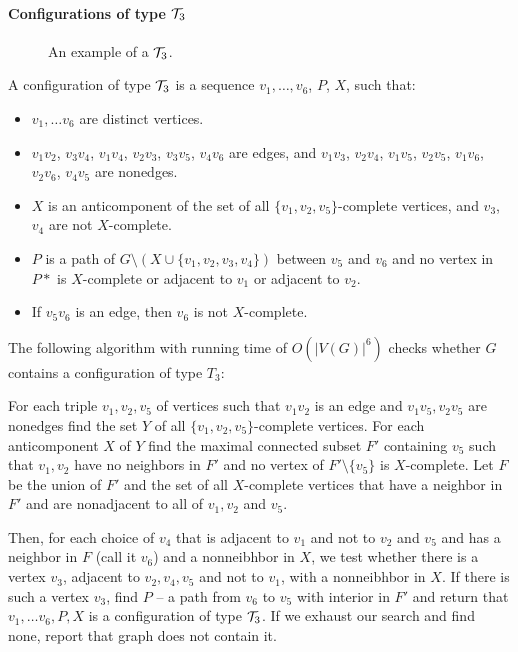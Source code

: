 \documentclass{article}
\begin{document}
\paragraph{Configurations of type $\mathcal{T}_3$}

\begin{wrapfigure}{r}{0.35\textwidth}
	
	\caption{An example of a $\mathcal{T}_3$.}%
	\vspace{-1.5cm}
\end{wrapfigure}

A configuration of type $\mathcal{T}_3$ is a sequence $v_1, \ldots, v_6$, $P$, $X$, such that:
\begin{itemize}
	\item $v_1, \ldots v_6$ are distinct vertices.
	\item $v_1v_2$, $v_3v_4$, $v_1v_4$, $v_2v_3$, $v_3v_5$, $v_4v_6$ are edges, and $v_1v_3$, $v_2v_4$, $v_1v_5$, $v_2v_5$, $v_1v_6$, $v_2v_6$, $v_4v_5$ are nonedges.
	\item $X$ is an anticomponent of the set of all $\{v_1, v_2, v_5\}$-complete vertices, and $v_3$, $v_4$ are not $X$-complete.
	\item $P$ is a path of $G \setminus ( X \cup \{v_1, v_2, v_3, v_4\} )$ between $v_5$ and $v_6$ and no vertex in $P*$ is $X$-complete or adjacent to $v_1$ or adjacent to $v_2$.
	\item If $v_5v_6$ is an edge, then $v_6$ is not $X$-complete.
\end{itemize}

The following algorithm with running time of $O(|V(G)|^6)$ checks whether $G$ contains a configuration of type $T_3$:

For each triple $v_1, v_2, v_5$ of vertices such that $v_1v_2$ is an edge and $v_1v_5, v_2v_5$ are nonedges find the set $Y$ of all $\{v_1, v_2, v_5\}$-complete vertices. For each anticomponent $X$ of $Y$ find the maximal connected subset $F'$ containing $v_5$ such that $v_1, v_2$ have no neighbors in $F'$ and no vertex of $F'\setminus\{v_5\}$ is $X$-complete. Let $F$ be the union of $F'$ and the set of all $X$-complete vertices that have a neighbor in $F'$ and are nonadjacent to all of $v_1, v_2$ and $v_5$.

Then, for each choice of $v_4$ that is adjacent to $v_1$ and not to $v_2$ and $v_5$ and has a neighbor in $F$ (call it $v_6$) and a nonneibhbor in $X$, we test whether there is a vertex $v_3$, adjacent to $v_2, v_4, v_5$ and not to $v_1$, with a nonneibhbor in $X$. If there is such a vertex $v_3$, find $P$ -- a path from $v_6$ to $v_5$ with interior in $F'$ and return that $v_1, \ldots v_6, P, X$ is a configuration of type $\mathcal{T}_3$. If we exhaust our search and find none, report that graph does not contain it.
\end{document}
